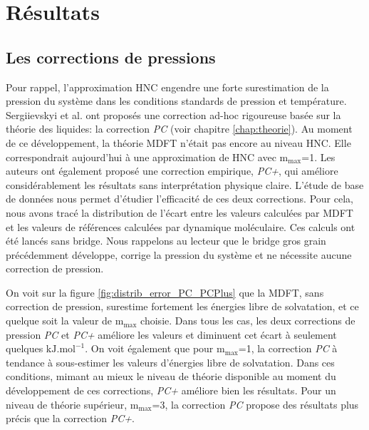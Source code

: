 \section{Résultats}
\subsection{Les corrections de pressions}\label{sec:corrections_pression}
Pour rappel, l'approximation HNC engendre une forte surestimation de la pression du système dans les conditions standards de pression et température. Sergiievskyi et al. \cite{sergiievskyi_solvation_2015,sergiievskyi_pressure_2015} ont proposés une correction ad-hoc rigoureuse basée sur la théorie des liquides: la correction \textit{PC} (voir chapitre \ref{chap:theorie}). Au moment de ce développement, la théorie MDFT n'était pas encore au niveau HNC. Elle correspondrait aujourd'hui à une approximation de HNC avec $\mathrm{m}_\mathrm{max}$=1. Les auteurs ont également proposé une correction empirique, \textit{PC+}, qui améliore considérablement les résultats sans interprétation physique claire. L'étude de base de données nous permet d'étudier l'efficacité de ces deux corrections. Pour cela, nous avons tracé la distribution de l'écart entre les valeurs calculées par MDFT et les valeurs de références calculées par dynamique moléculaire. Ces calculs ont été lancés sans bridge. Nous rappelons au lecteur que le bridge gros grain précédemment développe, corrige la pression du système et ne nécessite aucune correction de pression.

On voit sur la figure \ref{fig:distrib_error_PC_PCPlus} que la MDFT, sans correction de pression, surestime fortement les énergies libre de solvatation, et ce quelque soit la valeur de $\mathrm{m}_\mathrm{max}$ choisie. Dans tous les cas, les deux corrections de pression \textit{PC} et \textit{PC+} améliore les valeurs et diminuent cet écart à seulement quelques $\mathrm{kJ.mol}^{-1}$. On voit également que pour $\mathrm{m}_\mathrm{max}$=1, la correction \textit{PC} à tendance à sous-estimer les valeurs d'énergies libre de solvatation. Dans ces conditions, mimant au mieux le niveau de théorie disponible au moment du développement de ces corrections, \textit{PC+} améliore bien les résultats. Pour un niveau de théorie supérieur, $\mathrm{m}_\mathrm{max}$=3, la correction \textit{PC} propose des résultats plus précis que la correction \textit{PC+}.

